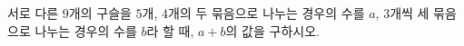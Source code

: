 \hspace*{2mm}\begin{minipage}[t]{\dimexpr\linewidth-2mm\relax}\vspace{0pt}
서로 다른 $9$개의 구슬을 $5$개, $4$개의 두 묶음으로 나누는 경우의 수를 $a$, $3$개씩 세 묶음으로 나누는 경우의 수를 $b$라 할 때, $a+b$의 값을 구하시오.\end{minipage}
